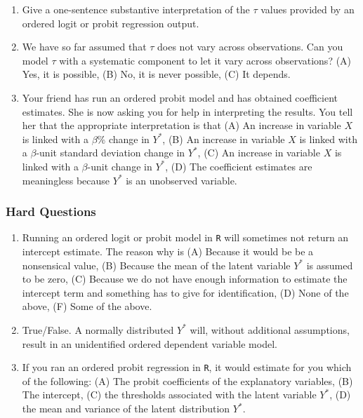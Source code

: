 \documentclass[11pt]{article}
\begin{document}
\begin{enumerate}
\item Give a one-sentence substantive interpretation of the $\tau$ values provided by an ordered logit or probit regression output. 
\item We have so far assumed that $\tau$ does not vary across observations.  Can you model $\tau$ with a systematic component to let it vary across observations? (A) Yes, it is possible, (B) No, it is never possible, (C) It depends. 
\item Your friend has run an ordered probit model and has obtained coefficient estimates. She is now asking you for help in interpreting the results. You tell her that the appropriate interpretation is that (A) An increase in variable $X$ is linked with a $\beta$\% change in $Y^*$, (B) An increase in variable $X$ is linked with a $\beta$-unit standard deviation change in $Y^*$, (C) An increase in variable $X$ is linked with a $\beta$-unit change in $Y^*$, (D) The coefficient estimates are meaningless because $Y^*$ is an unobserved variable. 
\end{enumerate}

\subsubsection{Hard Questions}

\begin{enumerate}
\item Running an ordered logit or probit model in \texttt{R} will sometimes not return an intercept estimate.  The reason why is (A) Because it would be be a nonsensical value, (B) Because the mean of the latent variable $Y^*$ is assumed to be zero, (C) Because we do not have enough information to estimate the intercept term and something has to give for identification, (D) None of the above, (F) Some of the above. 
\item True/False. A normally distributed $Y^*$ will, without additional assumptions, result in an unidentified ordered dependent variable model. 
\item If you ran an ordered probit regression in \texttt{R}, it would estimate for you which of the following: (A) The probit coefficients of the explanatory variables, (B) The intercept, (C) the thresholds associated with the latent variable $Y^*$, (D) the mean and variance of the latent distribution $Y^*$. 
\end{enumerate}
\end{document}

